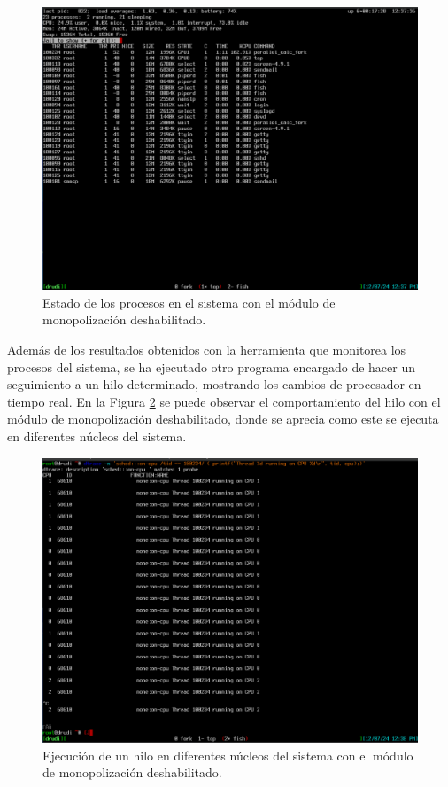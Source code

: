 \begin{figure}[H]
    \centering
    \includegraphics[width=1\textwidth]{images/top_disabled.png}
    \caption{Estado de los procesos en el sistema con el módulo de monopolización deshabilitado.}
    \label{fig:top_disabled}
\end{figure}

Además de los resultados obtenidos con la herramienta que monitorea los procesos del sistema, se ha ejecutado otro programa encargado de hacer un seguimiento a un hilo determinado, mostrando los cambios de procesador en tiempo real. En la Figura \ref{fig:dtrace_disabled} se puede observar el comportamiento del hilo con el módulo de monopolización deshabilitado, donde se aprecia como este se ejecuta en diferentes núcleos del sistema.\par

\begin{figure}[H]
    \centering
    \includegraphics[width=1\textwidth]{images/dtrace_disabled.png}
    \caption{Ejecución de un hilo en diferentes núcleos del sistema con el módulo de monopolización deshabilitado.}
    \label{fig:dtrace_disabled}
\end{figure}


